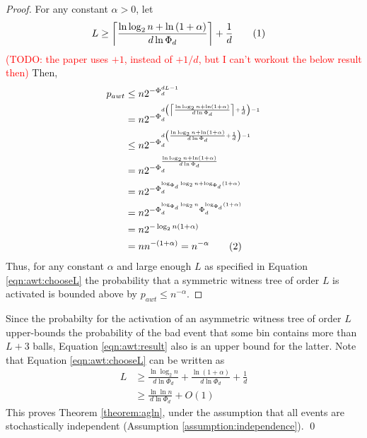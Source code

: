 \documentclass[a4paper,12pt]{article}
\newcommand\todo[1]{\textcolor{red}{(TODO: #1)}}
\newcommand\numberthis{\addtocounter{equation}{1}\tag{\theequation}}
\newcommand\neqn[1]{\numberthis\label{eqn:#1}}
\begin{document}
\begin{proof}
For any constant $\alpha > 0$, let 
\begin{align*}
L &\geq \left\lceil{\frac{\ln\log_2 n + \ln\left(1+\alpha\right)}{d \ln \Phi_d}}\right\rceil+\frac{1}{d} \neqn{awt:chooseL}
\end{align*}
\todo{the paper uses $+1$, instead of $+1/d$, but I can't workout the below result then} 
Then, 
\begin{align*}
p_{awt} &\leq n  2^{-\Phi_d^{d L -1}} \\
        &= n  2^{-\Phi_d^{d \left(\left\lceil{\frac{\ln\log_2 n + \ln\left(1+\alpha\right)}{d \ln \Phi_d}}\right\rceil+\frac{1}{d}\right) -1}} \\
        &\leq n  2^{-\Phi_d^{d \left({\frac{\ln\log_2 n + \ln\left(1+\alpha\right)}{d \ln \Phi_d}}+\frac{1}{d}\right) -1}} \\
        &= n  2^{-\Phi_d^{{\frac{\ln\log_2 n + \ln\left(1+\alpha\right)}{d \ln \Phi_d}}}} \\
        &= n  2^{-\Phi_d^{\log_{\Phi_d}\log_2 n + \log_{\Phi_d}\left(1+\alpha\right)}} \\
         &= n  2^{-\Phi_d^{\log_{\Phi_d}\log_2 n} \Phi_d^{ \log_{\Phi_d}\left(1+\alpha\right)}} \\
         &= n  2^{-\log_2 n \left(1+\alpha\right)} \\
         &= n  n ^{-(1+\alpha)} = n^{-\alpha} \neqn{awt:result}
\end{align*}
Thus, for any constant $\alpha$ and large enough $L$ as specified in Equation \ref{eqn:awt:chooseL} the probability that a symmetric witness tree of order $L$ is activated is bounded above by $p_{awt }\leq n^{-\alpha}$.
\end{proof}

Since the probabilty for the activation of an asymmetric witness tree of order $L$ upper-bounds the probability of the bad event that some bin contains more than $L+3$ balls, Equation \ref{eqn:awt:result} also is an upper bound for the latter. Note that Equation \ref{eqn:awt:chooseL} can be written as
\begin{align*}
L &\geq \frac{\ln\log_2 n}{d \ln \Phi_d} + \frac{\ln\left(1+\alpha\right)}{d \ln \Phi_d} + \frac{1}{d}\\
  &\geq \frac{\ln\ln n}{d \ln \Phi_d} + O\left(1\right)
\end{align*}
This proves Theorem \ref{theorem:agln}, under the assumption that all events are stochastically independent (Assumption \ref{assumption:independence}). \qed
\end{document}
